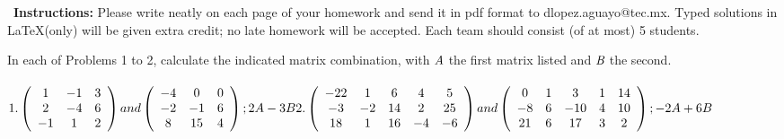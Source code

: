 \documentclass[12pt]{article}
\newcommand{\latex}{\LaTeX\xspace}
\newenvironment{problem}[2][Problem]{\begin{trivlist}
\item[\hskip \labelsep {\bfseries #1}\hskip \labelsep {\bfseries #2.}]}{\end{trivlist}}
\begin{document}


\noindent\ {\bfseries Instructions:} Please write neatly on each page of your homework and send it in pdf format to dlopez.aguayo@tec.mx. Typed solutions in \latex (only) will be given extra credit; no late homework will be accepted. Each team should consist (of at most) 5 students.




\begin{problem}{I} 
In each of Problems 1 to 2, calculate the indicated matrix combination, with ${\emph A}$ the first matrix listed and ${\emph B}$ the second. \\ \\
$1. \left(
\begin{array}{ccc}
 1 & -1 & 3 \\
 2 & -4 & 6 \\
 -1 & 1 & 2 \\
\end{array}\right) and \left(
\begin{array}{ccc}
 -4 & 0 & 0 \\
 -2 & -1 & 6 \\
 8 & 15 & 4 \\
\end{array}\right); 2A-3B \\ \\ \\
2.\left(
\begin{array}{ccccc}
 -22 & 1 & 6 & 4 & 5 \\
 -3 & -2 & 14 & 2 & 25 \\
 18 & 1 & 16 & -4 & -6 \\
\end{array}\right) and \left(
\begin{array}{ccccc}
 0 & 1 & 3 & 1 & 14 \\
 -8 & 6 & -10 & 4 & 10 \\
 21 & 6 & 17 & 3 & 2 \\
\end{array}\right); -2A+6B$ \\
\end{problem}
\end{document}
